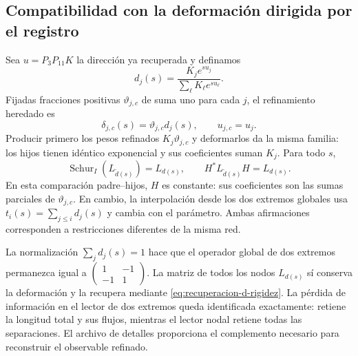 \subsection{Compatibilidad con la deformación dirigida por el registro}

Sea \(u=P_3P_{11}K\) la dirección ya recuperada y definamos
\[
 d_j(s)=\frac{K_je^{su_j}}{\sum_\ell K_\ell e^{su_\ell}}.
\]
Fijadas fracciones positivas \(\vartheta_{j,c}\) de suma uno para cada
\(j\), el refinamiento heredado es
\[
 \delta_{j,c}(s)=\vartheta_{j,c}d_j(s),\qquad
 u_{j,c}=u_j.
\]
Producir primero los pesos refinados \(K_j\vartheta_{j,c}\) y
deformarlos da la misma familia: los hijos tienen idéntico exponencial y
sus coeficientes suman \(K_j\). Para todo \(s\),
\begin{equation}
 \operatorname{Schur}_{I}(L_{\widetilde d(s)})=L_{d(s)},
 \qquad H^*L_{\widetilde d(s)}H=L_{d(s)}.
 \label{eq:schur-flujo-k}
\end{equation}
En esta comparación padre--hijos, \(H\) es constante: sus coeficientes
son las sumas parciales de \(\vartheta_{j,c}\). En cambio, la
interpolación desde los dos extremos globales usa
\(t_i(s)=\sum_{j\le i}d_j(s)\) y cambia con el parámetro. Ambas
afirmaciones corresponden a restricciones diferentes de la misma red.

La normalización \(\sum_jd_j(s)=1\) hace que el operador global de dos
extremos permanezca igual a
\(\left(\begin{smallmatrix}1&-1\\-1&1\end{smallmatrix}\right)\).
La matriz de todos los nodos \(L_{d(s)}\) sí conserva la deformación y
la recupera mediante \eqref{eq:recuperacion-d-rigidez}. La pérdida de
información en el lector de dos extremos queda identificada exactamente:
retiene la longitud total y sus flujos, mientras el lector nodal retiene
todas las separaciones. El archivo de detalles proporciona el complemento
necesario para reconstruir el observable refinado.
